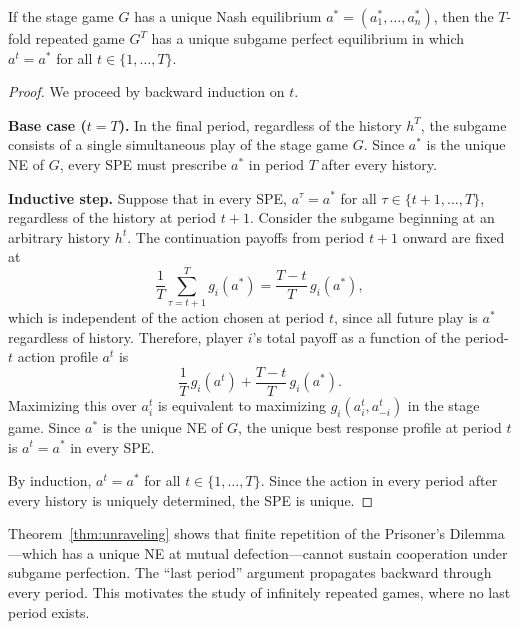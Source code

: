 \documentclass[11pt,a4paper]{article}
\begin{document}
\begin{keyresult}[title={Unraveling Theorem}]
\begin{theorem}
\label{thm:unraveling}
If the stage game $G$ has a unique Nash equilibrium
$a^* = (a_1^*, \ldots, a_n^*)$, then the $T$-fold repeated game $G^T$ has
a unique subgame perfect equilibrium in which $a^t = a^*$ for all
$t \in \{1, \ldots, T\}$.
\end{theorem}
\end{keyresult}

\begin{proof}
We proceed by backward induction on $t$.

\textbf{Base case ($t = T$).} In the final period, regardless of the
history $h^T$, the subgame consists of a single simultaneous play of the
stage game $G$. Since $a^*$ is the unique NE of $G$, every SPE must
prescribe $a^*$ in period $T$ after every history.

\textbf{Inductive step.} Suppose that in every SPE, $a^{\tau} = a^*$ for
all $\tau \in \{t+1, \ldots, T\}$, regardless of the history at period
$t+1$. Consider the subgame beginning at an arbitrary history $h^t$. The
continuation payoffs from period $t+1$ onward are fixed at
\[
    \frac{1}{T}\sum_{\tau=t+1}^{T} g_i(a^*)
    = \frac{T-t}{T}\, g_i(a^*),
\]
which is independent of the action chosen at period $t$, since all future
play is $a^*$ regardless of history. Therefore, player $i$'s total payoff
as a function of the period-$t$ action profile $a^t$ is
\[
    \frac{1}{T}\, g_i(a^t) + \frac{T-t}{T}\, g_i(a^*).
\]
Maximizing this over $a_i^t$ is equivalent to maximizing $g_i(a_i^t,
a_{-i}^t)$ in the stage game. Since $a^*$ is the unique NE of $G$, the
unique best response profile at period $t$ is $a^t = a^*$ in every SPE.

By induction, $a^t = a^*$ for all $t \in \{1, \ldots, T\}$. Since the
action in every period after every history is uniquely determined, the SPE
is unique.
\end{proof}

\begin{warning}[title={The Unraveling Trap}]
Theorem~\ref{thm:unraveling} shows that finite repetition of the Prisoner's
Dilemma---which has a unique NE at mutual defection---cannot sustain
cooperation under subgame perfection. The ``last period'' argument
propagates backward through every period. This motivates the study of
infinitely repeated games, where no last period exists.
\end{warning}
\end{document}
